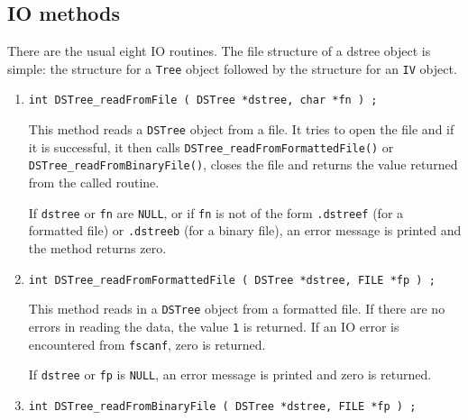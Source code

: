 \subsection{IO methods}
\label{subsection:DSTree:proto:IO}
\par
There are the usual eight IO routines.
The file structure of a dstree object is simple:
the structure for a {\tt Tree} object
followed by the structure for an {\tt IV} object.
\par
\begin{enumerate}
\item
\begin{verbatim}
int DSTree_readFromFile ( DSTree *dstree, char *fn ) ;
\end{verbatim}
\par
This method reads a {\tt DSTree} object from a file.
It tries to open the file and if it is successful, 
it then calls {\tt DSTree\_readFromFormattedFile()} or
{\tt DSTree\_readFromBinaryFile()}, 
closes the file
and returns the value returned from the called routine.
\par {}
If {\tt dstree} or {\tt fn} are {\tt NULL}, 
or if {\tt fn} is not of the form
{\tt *.dstreef} (for a formatted file) 
or {\tt *.dstreeb} (for a binary file),
an error message is printed and the method returns zero.
\item
\begin{verbatim}
int DSTree_readFromFormattedFile ( DSTree *dstree, FILE *fp ) ;
\end{verbatim}
\par
This method reads in a {\tt DSTree} object from a formatted file.
If there are no errors in reading the data, 
the value {\tt 1} is returned.
If an IO error is encountered from {\tt fscanf}, zero is returned.
\par {}
If {\tt dstree} or {\tt fp} is {\tt NULL}, 
an error message is printed and zero is returned.
\item
\begin{verbatim}
int DSTree_readFromBinaryFile ( DSTree *dstree, FILE *fp ) ;
\end{verbatim}

\end{enumerate}
